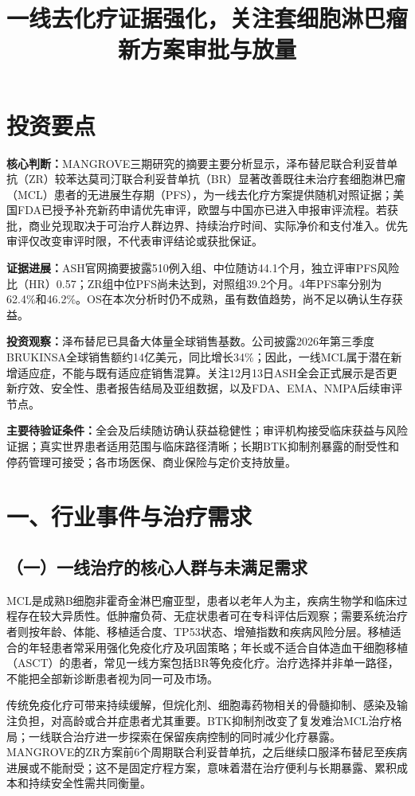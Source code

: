 \documentclass[a4paper,10pt,fontset=none]{ctexart}
\title{一线去化疗证据强化，关注套细胞淋巴瘤新方案审批与放量}
\author{}
\date{}
\begin{document}
\maketitle

\section*{投资要点}
\noindent\textbf{核心判断：}MANGROVE三期研究的摘要主要分析显示，泽布替尼联合利妥昔单抗（ZR）较苯达莫司汀联合利妥昔单抗（BR）显著改善既往未治疗套细胞淋巴瘤（MCL）患者的无进展生存期（PFS），为一线去化疗方案提供随机对照证据；美国FDA已授予补充新药申请优先审评，欧盟与中国亦已进入申报审评流程。若获批，商业兑现取决于可治疗人群边界、持续治疗时间、实际净价和支付准入。优先审评仅改变审评时限，不代表审评结论或获批保证。\par
\noindent\textbf{证据进展：}ASH官网摘要披露510例入组、中位随访44.1个月，独立评审PFS风险比（HR）0.57；ZR组中位PFS尚未达到，对照组39.2个月。4年PFS率分别为62.4\%和46.2\%。OS在本次分析时仍不成熟，虽有数值趋势，尚不足以确认生存获益。\par
\noindent\textbf{投资观察：}泽布替尼已具备大体量全球销售基数。公司披露2026年第三季度BRUKINSA全球销售额约14亿美元，同比增长34\%；因此，一线MCL属于潜在新增适应症，不能与既有适应症销售混算。关注12月13日ASH全会正式展示是否更新疗效、安全性、患者报告结局及亚组数据，以及FDA、EMA、NMPA后续审评节点。\par
\noindent\textbf{主要待验证条件：}全会及后续随访确认获益稳健性；审评机构接受临床获益与风险证据；真实世界患者适用范围与临床路径清晰；长期BTK抑制剂暴露的耐受性和停药管理可接受；各市场医保、商业保险与定价支持放量。

\section*{一、行业事件与治疗需求}
\subsection*{（一）一线治疗的核心人群与未满足需求}
MCL是成熟B细胞非霍奇金淋巴瘤亚型，患者以老年人为主，疾病生物学和临床过程存在较大异质性。低肿瘤负荷、无症状患者可在专科评估后观察；需要系统治疗者则按年龄、体能、移植适合度、TP53状态、增殖指数和疾病风险分层。移植适合的年轻患者常采用强化免疫化疗及巩固策略；年长或不适合自体造血干细胞移植（ASCT）的患者，常见一线方案包括BR等免疫化疗。治疗选择并非单一路径，不能把全部新诊断患者视为同一可及市场。

传统免疫化疗可带来持续缓解，但烷化剂、细胞毒药物相关的骨髓抑制、感染及输注负担，对高龄或合并症患者尤其重要。BTK抑制剂改变了复发难治MCL治疗格局；一线联合治疗进一步探索在保留疾病控制的同时减少化疗暴露。MANGROVE的ZR方案前6个周期联合利妥昔单抗，之后继续口服泽布替尼至疾病进展或不能耐受；这不是固定疗程方案，意味着潜在治疗便利与长期暴露、累积成本和持续安全性需共同衡量。
\end{document}
